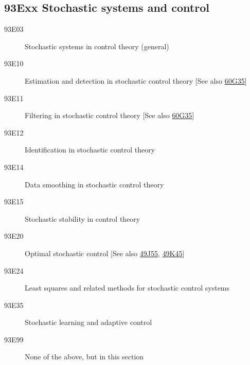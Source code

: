 \documentclass[letterpaper]{article}
\begin{document}
\subsection*{93Exx  Stochastic systems and control }\label{93Exx}
\begin{description}  
\item [93E03]\label{93E03} Stochastic systems in control theory (general)
\item [93E10]\label{93E10} Estimation and detection in stochastic control theory [See also \hyperref[60G35]{60G35}]
\item [93E11]\label{93E11} Filtering in stochastic control theory [See also \hyperref[60G35]{60G35}]
\item [93E12]\label{93E12} Identification in stochastic control theory
\item [93E14]\label{93E14} Data smoothing in stochastic control theory
\item [93E15]\label{93E15} Stochastic stability in control theory
\item [93E20]\label{93E20} Optimal stochastic control [See also \hyperref[49J55]{49J55}, \hyperref[49K45]{49K45}]
\item [93E24]\label{93E24} Least squares and related methods for stochastic control systems
\item [93E35]\label{93E35} Stochastic learning and adaptive control
\item [93E99]\label{93E99} None of the above, but in this section
\end{description}
\end{document}

